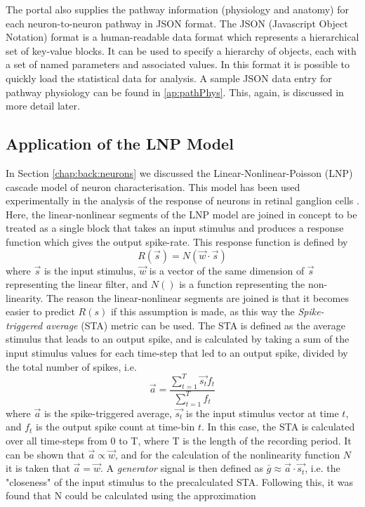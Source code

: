 The portal also supplies the pathway information (physiology and anatomy) for each neuron-to-neuron pathway in JSON format. The JSON (Javascript Object Notation) format is a human-readable data format which represents a hierarchical set of key-value blocks. It can be used to specify a hierarchy of objects, each with a set of named parameters and associated values. In this format it is possible to quickly load the statistical data for analysis. A sample JSON data entry for pathway physiology can be found in \ref{ap:pathPhys}. This, again, is discussed in more detail later.

\subsection{Application of the LNP Model}
In Section \ref{chap:back:neurons} we discussed the Linear-Nonlinear-Poisson (LNP) cascade model of neuron characterisation. This model has been used experimentally in the analysis of the response of neurons in retinal ganglion cells \cite{lnpInBrain}. Here, the linear-nonlinear segments of the LNP model are joined in concept to be treated as a single block that takes an input stimulus and produces a response function which gives the output spike-rate. This response function is defined by
\begin{equation}
    \label{rsLnp}
    R(\vec{s}) = N(\vec{w} \cdot \vec{s})
\end{equation}
where $\vec{s}$ is the input stimulus, $\vec{w}$ is a vector of the same dimension of $\vec{s}$ representing the linear filter, and $N()$ is a function representing the non-linearity. The reason the linear-nonlinear segments are joined is that it becomes easier to predict $R(s)$ if this assumption is made, as this way the \emph{Spike-triggered average} (STA) metric can be used. The STA is defined as the average stimulus that leads to an output spike, and is calculated by taking a sum of the input stimulus values for each time-step that led to an output spike, divided by the total number of spikes, i.e.
\begin{equation}
    \label{staLnp}
    \vec{a} = \frac{ \sum_{t=1}^{T}\vec{s_{t}}f_{t}}{ \sum_{t=1}^{T}f_{t} }
\end{equation}
where $\vec{a}$ is the spike-triggered average, $\vec{s_{t}}$ is the input stimulus vector at time $t$, and $f_{t}$ is the output spike count at time-bin $t$. In this case, the STA is calculated over all time-steps from 0 to T, where T is the length of the recording period. It can be shown that $\vec{a} \propto \vec{w}$, and for the calculation of the nonlinearity function $N$ it is taken that $\vec{a} = \vec{w}$. A \emph{generator} signal is then defined as $\bar{g} \approx \vec{a} \cdot \vec{s_{t}}$, i.e. the "closeness" of the input stimulus to the precalculated STA. Following this, it was found that N could be calculated using the approximation
